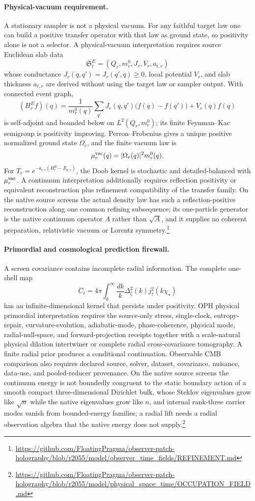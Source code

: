 \paragraph{Physical-vacuum requirement.}
A stationary sampler is not a physical vacuum.  For any faithful target law one can build a
positive transfer operator with that law as ground state, so positivity alone is not a selector.
A physical-vacuum interpretation requires source Euclidean slab data
\[
\mathfrak S_r^E=(Q_r,m_r^0,J_r,V_r,a_{t,r})
\]
whose conductance \(J_r(q,q')=J_r(q',q)\ge0\), local potential \(V_r\), and slab thickness
\(a_{t,r}\) are derived without using the target law or sampler output.  With connected event graph,
\[
(H_r^Ef)(q)
=
\frac{1}{m_r^0(q)}
\sum_{q'}J_r(q,q')\bigl(f(q)-f(q')\bigr)
+
V_r(q)f(q)
\]
is self-adjoint and bounded below on \(L^2(Q_r,m_r^0)\); its finite Feynman--Kac semigroup is
positivity improving.  Perron--Frobenius gives a unique positive normalized ground state
\(\Omega_r\), and the finite vacuum law is
\[
\mu_r^{\rm vac}(q)=|\Omega_r(q)|^2m_r^0(q).
\]
For \(T_r=e^{-a_{t,r}(H_r^E-E_{0,r})}\), the Doob kernel is stochastic and detailed-balanced with
\(\mu_r^{\rm vac}\).  A continuum interpretation additionally requires reflection positivity or
equivalent reconstruction plus refinement compatibility of the transfer family.
On the native source screens the actual density law has such a
reflection-positive reconstruction along one common refining subsequence;
its one-particle generator is the native continuum operator $A$ rather than
$\sqrt A$, and it supplies no coherent preparation, relativistic vacuum or
Lorentz symmetry.\footnote{\url{https://github.com/FloatingPragma/observer-patch-holography/blob/r2055/model/observer_time_fields/REFINEMENT.md}}

\paragraph{Primordial and cosmological prediction firewall.}
A screen covariance contains incomplete radial information. The complete
one-shell map
\[
C_\ell
=
4\pi
\int_0^\infty
\frac{dk}{k}
\Delta_\zeta^2(k)j_\ell^2(k\chi_\star)
\]
has an infinite-dimensional kernel that persists under positivity. OPH
physical primordial interpretation requires the source-only stress, single-clock,
entropy-repair, curvature-evolution, adiabatic-mode, phase-coherence, physical
mode, radial-null-space, and forward-projection receipts together with a
scale-natural physical dilation intertwiner or complete radial cross-covariance
tomography. A finite radial prior produces a conditional continuation.
Observable CMB comparison also requires declared source, solver,
dataset, covariance, nuisance, data-use, and pooled-reducer provenance.
On the native source screens the continuum energy is not boundedly
congruent to the static boundary action of a smooth compact
three-dimensional Dirichlet bulk, whose Steklov eigenvalues grow like
$\sqrt n$ while the native eigenvalues grow like $n$, and internal rank-three
carrier modes vanish from bounded-energy families; a radial lift needs a
radial observation algebra that the native energy does not
supply.\footnote{\url{https://github.com/FloatingPragma/observer-patch-holography/blob/r2055/model/physical_space_time/OCCUPATION_FIELD.md}}

